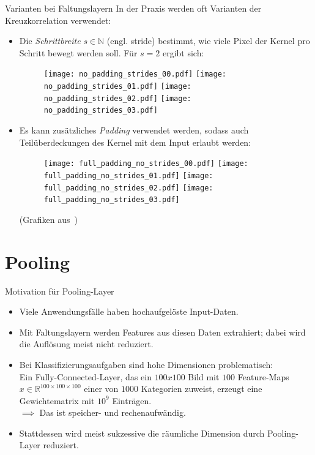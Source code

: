 \documentclass[envcountsect, smaller, aspectratio=149]{beamer}
\newcommand{\R}{\mathbb{R}}
\newcommand{\N}{\mathbb{N}}
\begin{document}
\begin{frame}{Varianten bei Faltungslayern}
    In der Praxis werden oft Varianten der Kreuzkorrelation verwendet:
    \begin{itemize}
        \item Die \emph{Schrittbreite} $s\in\N$ (engl. \foreignlanguage{english}{stride}) bestimmt, wie viele Pixel der Kernel pro Schritt bewegt werden soll.
        Für $s=2$ ergibt sich:
        \begin{figure}
            \centering
            \texttt{[image: no\_padding\_strides\_00.pdf]}
            \texttt{[image: no\_padding\_strides\_01.pdf]}
            \texttt{[image: no\_padding\_strides\_02.pdf]}
            \texttt{[image: no\_padding\_strides\_03.pdf]}
        \end{figure}
        \item Es kann zusätzliches \emph{Padding} verwendet werden, sodass auch Teilüberdeckungen des Kernel mit dem Input erlaubt werden:
        \begin{figure}
            \centering
            \texttt{[image: full\_padding\_no\_strides\_00.pdf]}
            \texttt{[image: full\_padding\_no\_strides\_01.pdf]}
            \texttt{[image: full\_padding\_no\_strides\_02.pdf]}
            \texttt{[image: full\_padding\_no\_strides\_03.pdf]}
        \end{figure}

        \begin{center}
            \scriptsize (Grafiken aus~\cite{dumoulin2016guide})
        \end{center}
    \end{itemize}
\end{frame}




\section{Pooling}

\begin{frame}{Motivation für Pooling-Layer}
    \begin{itemize}
        \pause \item Viele Anwendungsfälle haben hochaufgelöste Input-Daten.
        \pause \item Mit Faltungslayern werden Features aus diesen Daten extrahiert; dabei wird die Auflösung meist nicht reduziert.
        \pause \item Bei Klassifizierungsaufgaben sind hohe Dimensionen problematisch: \\
        Ein Fully-Connected-Layer, das ein $100x100$ Bild mit $100$ Feature-Maps $x\in\R^{100\times 100\times 100}$ einer von $1000$ Kategorien zuweist, erzeugt eine Gewichtematrix mit $10^{9}$ Einträgen.\\
        $\implies$ Das ist speicher- und rechenaufwändig.
        \pause \item Stattdessen wird meist sukzessive die räumliche Dimension durch Pooling-Layer reduziert.
    \end{itemize}
\end{frame}
\end{document}
